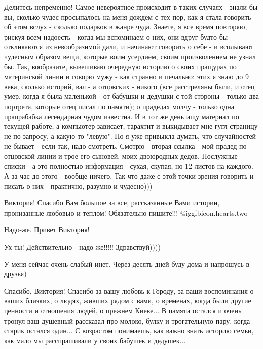 \begin{itemize}
\begin{itemize}
Делитесь непременно! Самое невероятное происходит в таких случаях - знали бы
вы, сколько чудес просыпалось на меня дождем с тех пор, как я стала говорить об
этом вслух - сколько подарков в жанре чуда. Знаете, я все время повторяю,
рискуя всем надоесть - когда мы вспоминаем о них, они вдруг будто бы
откликаются из невообразимой дали, и начинают говорить о себе - и всплывают
чудесным образом вещи, которые воим усердием, своим произволением не узнал бы.
Так, вообразите, вывешиваю очередную историю о своих пращурах по материнской
линии и говорю мужу - как странно и печально: этих я знаю до 9 века, сколько
историй, вал - а отцовских - никого (все расстреляны были, и отец умер, когда я
была маленькой - от бабушки и дедушки с той стороны - только два портрета,
которые отец писал по памяти); о прадедах молчу - только одна прапрабабка
легендарная чудом известна. И в тот же день ищу материал по текущей работе, а
компьютер зависает, тарахтит и выкидывает мне гугл-страницу не по запросу, а
какую-то "левую". Но я уже привыкла думать, что случайностей не бывает - если
так, надо смотреть. Смотрю - вторая ссылка - мой прадед по отцовской линии и
трое его сыновей, моих двоюродных дедов. Послужные списки - а это полностью
информация - сухая, скупая, но 12 листов на каждого. А за час до этого - вообще
ничего. Так что даже с этой точки зрения говорить и писать о них - практично,
разумно и чудесно)))


Виктория! Спасибо Вам большое за все, рассказанные Вами истории, пронизанные
любовью и теплом! Обязательно пишите!!! @igg{fbicon.hearts.two} 

\end{itemize} %

Надо-же. Привет Виктория!

\begin{itemize} %
Ух ты! Действительно - надо же!!!!! Здравствуй))))

У меня сейчас очень слабый инет. Через десять дней буду дома и напрошусь в друзья)
\end{itemize} %


Спасибо, Виктория! Спасибо за вашу любовь к Городу, за ваши воспоминания о
ваших близких, о людях, живших рядом с вами, о временах, когда были другие
ценности и отношения людей, о прежнем Киеве... В памяти остался и очень тронул
ваш душевный рассказал про молоко, булку и трогательную пару, когда старик
остался один... С возрастом понимаешь, как важно знать историю семьи, как мало
мы расспрашивали у своих бабушек и дедушек...


\end{itemize}
